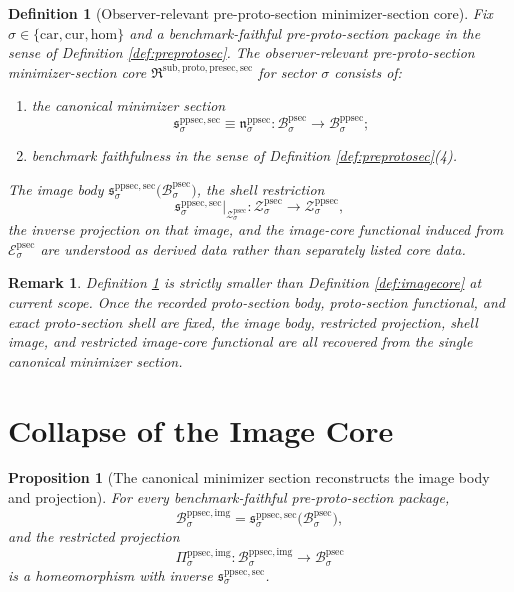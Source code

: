 \documentclass[11pt]{article}
\newcommand{\Car}{\mathrm{car}}
\newcommand{\Cur}{\mathrm{cur}}
\newcommand{\Hom}{\mathrm{hom}}
\newcommand{\ProtoSectionBody}[1]{\mathcal B_{#1}^{\mathrm{psec}}}
\newcommand{\ProtoSectionFunctional}[1]{\mathscr E_{#1}^{\mathrm{psec}}}
\newcommand{\ProtoSectionShell}[1]{\mathcal Z_{#1}^{\mathrm{psec}}}
\newcommand{\PreProtoSectionBody}[1]{\mathcal B_{#1}^{\mathrm{ppsec}}}
\newcommand{\PreProtoSectionProtoMin}[1]{\mathfrak n_{#1}^{\mathrm{ppsec}}}
\newcommand{\PreProtoSectionShell}[1]{\mathcal Z_{#1}^{\mathrm{ppsec}}}
\newcommand{\PreProtoSectionImgBody}[1]{\mathcal B_{#1}^{\mathrm{ppsec,img}}}
\newcommand{\PreProtoSectionImgProj}[1]{\Pi_{#1}^{\mathrm{ppsec,img}}}
\newcommand{\PreProtoSectionMinSectionCore}{\mathfrak R^{\mathrm{sub,proto,presec,sec}}}
\newcommand{\PreProtoSectionMinSection}[1]{\mathfrak s_{#1}^{\mathrm{ppsec,sec}}}
\newtheorem{definition}{Definition}
\newtheorem{proposition}{Proposition}
\newtheorem{remark}{Remark}
\begin{document}
\begin{definition}[Observer-relevant pre-proto-section minimizer-section core]
\label{def:sectioncore}
Fix \(\sigma\in\{\Car,\Cur,\Hom\}\) and a benchmark-faithful pre-proto-section package in the sense of Definition \ref{def:preprotosec}. The \emph{observer-relevant pre-proto-section minimizer-section core} \(\PreProtoSectionMinSectionCore\) for sector \(\sigma\) consists of:
\begin{enumerate}
    \item the canonical minimizer section
    \[
    \PreProtoSectionMinSection{\sigma}
    \equiv
    \PreProtoSectionProtoMin{\sigma}
    :
    \ProtoSectionBody{\sigma}\to\PreProtoSectionBody{\sigma};
    \]
    \item benchmark faithfulness in the sense of Definition \ref{def:preprotosec}(4).
\end{enumerate}
The image body \(\PreProtoSectionMinSection{\sigma}\bigl(\ProtoSectionBody{\sigma}\bigr)\), the shell restriction
\[
\PreProtoSectionMinSection{\sigma}\big|_{\ProtoSectionShell{\sigma}}
:
\ProtoSectionShell{\sigma}\to\PreProtoSectionShell{\sigma},
\]
the inverse projection on that image, and the image-core functional induced from \(\ProtoSectionFunctional{\sigma}\) are understood as derived data rather than separately listed core data.
\end{definition}

\begin{remark}
Definition \ref{def:sectioncore} is strictly smaller than Definition \ref{def:imagecore} at current scope. Once the recorded proto-section body, proto-section functional, and exact proto-section shell are fixed, the image body, restricted projection, shell image, and restricted image-core functional are all recovered from the single canonical minimizer section.
\end{remark}

\section{Collapse of the Image Core}

\begin{proposition}[The canonical minimizer section reconstructs the image body and projection]
\label{prop:reconstructbody}
For every benchmark-faithful pre-proto-section package,
\[
\PreProtoSectionImgBody{\sigma}
=
\PreProtoSectionMinSection{\sigma}\bigl(\ProtoSectionBody{\sigma}\bigr),
\]
and the restricted projection
\[
\PreProtoSectionImgProj{\sigma}:\PreProtoSectionImgBody{\sigma}\to\ProtoSectionBody{\sigma}
\]
is a homeomorphism with inverse \(\PreProtoSectionMinSection{\sigma}\).
\end{proposition}
\end{document}
